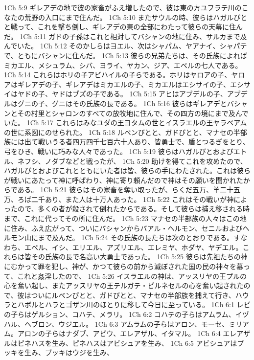 1Ch 5:9  ギレアデの地で彼の家畜がふえ増したので、彼は東の方ユフラテ川のこなたの荒野の入口にまで住んだ。
1Ch 5:10  またサウルの時、彼らはハガルびとと戦って、これを撃ち倒し、ギレアデの東の全部にわたって彼らの天幕に住んだ。
1Ch 5:11  ガドの子孫はこれと相対してバシャンの地に住み、サルカまで及んでいた。
1Ch 5:12  そのかしらはヨエル、次はシャパム、ヤアナイ、シャパテで、ともにバシャンに住んだ。
1Ch 5:13  彼らの兄弟たちは、その氏族によればミカエル、メシュラム、シバ、ヨライ、ヤカン、ジア、エベルの七人である。
1Ch 5:14  これらはホリの子アビハイルの子らである。ホリはヤロアの子、ヤロアはギレアデの子、ギレアデはミカエルの子、ミカエルはエシサイの子、エシサイはヤドの子、ヤドはブズの子である。
1Ch 5:15  アヒはアブデルの子、アブデルはグニの子、グニはその氏族の長である。
1Ch 5:16  彼らはギレアデとバシャンとその村里とシャロンのすべての放牧地に住んで、その四方の境にまで及んでいた。
1Ch 5:17  これらはみなユダの王ヨタムの世とイスラエルの王ヤラベアムの世に系図にのせられた。
1Ch 5:18  ルベンびとと、ガドびとと、マナセの半部族には出て戦いうる者四万四千七百六十人あり、皆勇士で、盾とつるぎをとり、弓をひき、戦いに巧みな人々であった。
1Ch 5:19  彼らはハガルびとおよびエトル、ネフシ、ノダブなどと戦ったが、
1Ch 5:20  助けを得てこれを攻めたので、ハガルびとおよびこれとともにいた者は皆、彼らの手にわたされた。これは彼らが戦いにあたって神に呼ばわり、神に寄り頼んだので神はその願いを聞かれたからである。
1Ch 5:21  彼らはその家畜を奪い取ったが、らくだ五万、羊二十五万、ろば二千あり、また人は十万人あった。
1Ch 5:22  これはその戦いが神によったので、多くの者が殺されて倒れたからである。そして彼らは捕え移される時まで、これに代ってその所に住んだ。
1Ch 5:23  マナセの半部族の人々はこの地に住み、ふえ広がって、ついにバシャンからバアル・ヘルモン、セニルおよびヘルモン山にまで及んだ。
1Ch 5:24  その氏族の長たちは次のとおりである。すなわち、エペル、イシ、エリエル、アズリエル、エレミヤ、ホダヤ、ヤデエル。これらは皆その氏族の長で名高い大勇士であった。
1Ch 5:25  彼らは先祖たちの神にむかって罪を犯し、神が、かつて彼らの前から滅ぼされた国の民の神々を慕って、これと姦淫したので、
1Ch 5:26  イスラエルの神は、アッスリヤの王プルの心を奮い起し、またアッスリヤの王テルガテ・ピルネセルの心を奮い起されたので、彼はついにルベンびとと、ガドびとと、マナセの半部族を捕えて行き、ハウラとハボルとハラとゴザン川のほとりに移して今日に至っている。
1Ch 6:1  レビの子らはゲルション、コハテ、メラリ。
1Ch 6:2  コハテの子らはアムラム、イヅハル、ヘブロン、ウジエル。
1Ch 6:3  アムラムの子らはアロン、モーセ、ミリアム。アロンの子らはナダブ、アビウ、エレアザル、イタマル。
1Ch 6:4  エレアザルはピネハスを生み、ピネハスはアビシュアを生み、
1Ch 6:5  アビシュアはブッキを生み、ブッキはウジを生み、
